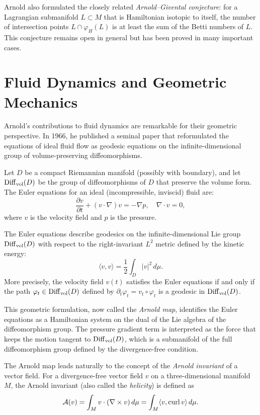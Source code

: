 Arnold also formulated the closely related \emph{Arnold--Givental conjecture}: for a Lagrangian submanifold \(L \subset M\) that is Hamiltonian isotopic to itself, the number of intersection points \(L \cap \varphi_H(L)\) is at least the sum of the Betti numbers of \(L\). This conjecture remains open in general but has been proved in many important cases.

\section{Fluid Dynamics and Geometric Mechanics}

Arnold's contributions to fluid dynamics are remarkable for their geometric perspective. In 1966, he published a seminal paper that reformulated the equations of ideal fluid flow as geodesic equations on the infinite-dimensional group of volume-preserving diffeomorphisms.

Let \(D\) be a compact Riemannian manifold (possibly with boundary), and let \(\operatorname{Diff}_{\operatorname{vol}}(D)\) be the group of diffeomorphisms of \(D\) that preserve the volume form. The Euler equations for an ideal (incompressible, inviscid) fluid are:
\[
\frac{\partial v}{\partial t} + (v \cdot \nabla)v = -\nabla p, \quad \nabla \cdot v = 0,
\]
where \(v\) is the velocity field and \(p\) is the pressure.

\begin{remark}
The Euler equations describe geodesics on the infinite-dimensional Lie group \(\operatorname{Diff}_{\operatorname{vol}}(D)\) with respect to the right-invariant \(L^2\) metric defined by the kinetic energy:
\[
\langle v,v\rangle = \frac{1}{2}\int_D |v|^2\,d\mu.
\]
More precisely, the velocity field \(v(t)\) satisfies the Euler equations if and only if the path \(\varphi_t \in \operatorname{Diff}_{\operatorname{vol}}(D)\) defined by \(\partial_t\varphi_t = v_t \circ \varphi_t\) is a geodesic in \(\operatorname{Diff}_{\operatorname{vol}}(D)\).
\end{remark}

This geometric formulation, now called the \emph{Arnold map}, identifies the Euler equations as a Hamiltonian system on the dual of the Lie algebra of the diffeomorphism group. The pressure gradient term is interpreted as the force that keeps the motion tangent to \(\operatorname{Diff}_{\operatorname{vol}}(D)\), which is a submanifold of the full diffeomorphism group defined by the divergence-free condition.

The Arnold map leads naturally to the concept of the \emph{Arnold invariant} of a vector field. For a divergence-free vector field \(v\) on a three-dimensional manifold \(M\), the Arnold invariant (also called the \emph{helicity}) is defined as
\[
\mathcal{A}(v) = \int_M v \cdot (\nabla \times v)\,d\mu = \int_M \langle v,\operatorname{curl} v\rangle\,d\mu.
\]

